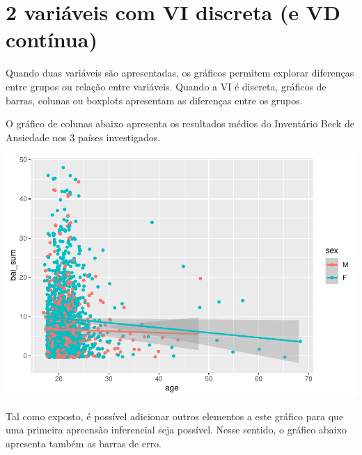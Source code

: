 \documentclass[
]{book}
\newenvironment{Shaded}{\begin{snugshade}}{\end{snugshade}}
\newcommand{\DataTypeTok}[1]{\textcolor[rgb]{0.13,0.29,0.53}{#1}}
\newcommand{\KeywordTok}[1]{\textcolor[rgb]{0.13,0.29,0.53}{\textbf{#1}}}
\newcommand{\NormalTok}[1]{#1}
\newcommand{\OperatorTok}[1]{\textcolor[rgb]{0.81,0.36,0.00}{\textbf{#1}}}
\newcommand{\StringTok}[1]{\textcolor[rgb]{0.31,0.60,0.02}{#1}}
\begin{document}
\hypertarget{variuxe1veis-com-vi-discreta-e-vd-contuxednua}{%
\section{2 variáveis com VI discreta (e VD contínua)}\label{variuxe1veis-com-vi-discreta-e-vd-contuxednua}}

Quando duas variáveis são apresentadas, os gráficos permitem explorar diferenças entre grupos ou relação entre variáveis. Quando a VI é discreta, gráficos de barras, colunas ou boxplots apresentam as diferenças entre os grupos.

O gráfico de colunas abaixo apresenta os resultados médios do Inventário Beck de Ansiedade nos 3 países investigados.

\begin{Shaded}
\end{Shaded}

\begin{center}\includegraphics{gitbook-demo_files/figure-latex/unnamed-chunk-26-1} \end{center}

Tal como exposto, é possível adicionar outros elementos a este gráfico para que uma primeira apreensão inferencial seja possível. Nesse sentido, o gráfico abaixo apresenta também as barras de erro.
\end{document}
